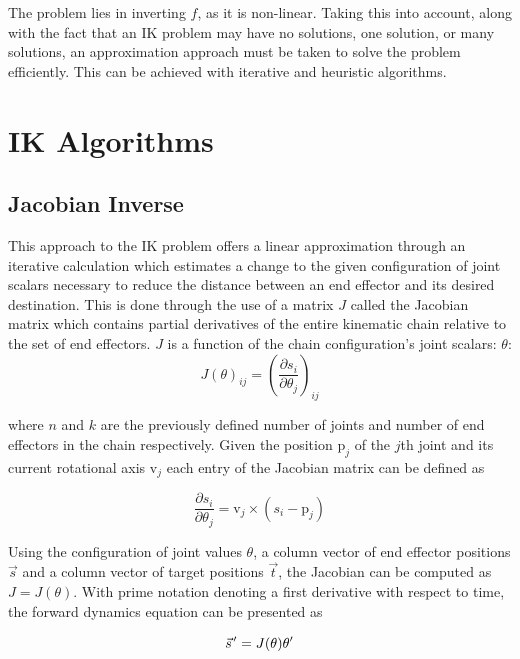 The problem lies in inverting \(f\), as it is non-linear. Taking this into
account, along with the fact that an IK problem may have no solutions, one
solution, or many solutions, an approximation approach must be taken to solve
the problem efficiently. This can be achieved with iterative and heuristic
algorithms.

\section{IK Algorithms}
\subsection{Jacobian Inverse}
This approach to the IK problem \cite{BALESTRINO19842435, wolovich, Baillieul} offers
a linear approximation through an iterative calculation which estimates a change
to the given configuration of joint scalars necessary to reduce the distance
between an end effector and its desired destination. This is done through the
use of a matrix \(J\) called the Jacobian matrix which contains partial derivatives of
the entire kinematic chain relative to the set of end effectors. \(J\) is
a function of the chain configuration's joint scalars:
\(\theta\):
\begin{equation}
    J(\theta)_{ij} = \left(\frac{\partial s_i}{\partial \theta_j}\right)_{ij}
\end{equation}

where \(n\) and \(k\) are the previously defined number of joints and number of
end effectors in the chain respectively. Given the position \(\mbox{p}_j\) of
the \(j\)th joint and its current rotational axis \(\mbox{v}_j\) each entry of
the Jacobian matrix can be defined as

\begin{equation}
    \frac{\partial s_i}{\partial \theta_j} = \mbox{v}_j \times (s_i - \mbox{p}_j)
\end{equation}

Using the configuration of joint values \(\theta\), a column vector of end
effector positions \(\vec{s}\) and a column vector of target positions
\(\vec{t}\), the Jacobian can be computed as \(J = J(\theta)\). With prime
notation denoting a first derivative with respect to time, the forward dynamics
equation can be presented as

\begin{equation}
    \pvec{s}^\prime = J(\theta)\theta^\prime
\end{equation}

